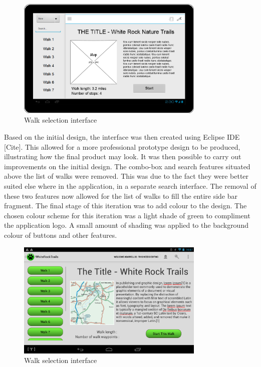 \documentclass[11pt,a4paper]{report}
\begin{document}
\begin{figure}[H]
    \centering
    \includegraphics[width=0.8\textwidth]{chris/pencil_choose_walk}
    \caption{Walk selection interface}
    \label{fig:view_walk}
\end{figure}

Based on the initial design, the interface was then created using Eclipse IDE [Cite]. This allowed for a more professional prototype design to be produced, illustrating how the final product may look. It was then possible to carry out improvements on the initial design. The combo-box and search features situated above the list of walks were removed. This was due to the fact they were better suited else where in the application, in a separate search interface. The removal of these two features now allowed for the list of walks to fill the entire side bar fragment. The final stage of this iteration was to add colour to the design. The chosen colour scheme for this iteration was a light shade of green to compliment the application logo. A small amount of shading was applied to the background colour of buttons and other features. 

\begin{figure}[H]
    \centering
    \includegraphics[width=0.8\textwidth]{chris/app_choose_walk}
    \caption{Walk selection interface}
    \label{fig:view_walk}
\end{figure}
\end{document}
